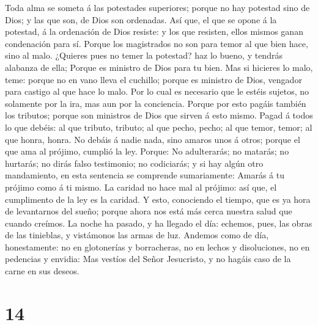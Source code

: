  Toda alma se someta á las potestades superiores; porque
no hay potestad sino de Dios; y las que son, de Dios son ordenadas.
 Así que, el que se opone á la potestad, á la ordenación
de Dios resiste: y los que resisten, ellos mismos ganan condenación para
sí.  Porque los magistrados no son para temor al que bien
hace, sino al malo. ¿Quieres pues no temer la potestad? haz lo bueno, y
tendrás alabanza de ella;  Porque es ministro de Dios para
tu bien. Mas si hicieres lo malo, teme: porque no en vano lleva el
cuchillo; porque es ministro de Dios, vengador para castigo al que hace
lo malo.  Por lo cual es necesario que le estéis sujetos,
no solamente por la ira, mas aun por la conciencia. 
Porque por esto pagáis también los tributos; porque son ministros de
Dios que sirven á esto mismo.  Pagad á todos lo que
debéis: al que tributo, tributo; al que pecho, pecho; al que temor,
temor; al que honra, honra.  No debáis á nadie nada, sino
amaros unos á otros; porque el que ama al prójimo, cumplió la ley.
 Porque: No adulterarás; no matarás; no hurtarás; no dirás
falso testimonio; no codiciarás; y si hay algún otro mandamiento, en
esta sentencia se comprende sumariamente: Amarás á tu prójimo como á ti
mismo.  La caridad no hace mal al prójimo: así que, el
cumplimento de la ley es la caridad.  Y esto, conociendo
el tiempo, que es ya hora de levantarnos del sueño; porque ahora nos
está más cerca nuestra salud que cuando creímos.  La
noche ha pasado, y ha llegado el día: echemos, pues, las obras de las
tinieblas, y vistámonos las armas de luz.  Andemos como
de día, honestamente: no en glotonerías y borracheras, no en lechos y
disoluciones, no en pedencias y envidia:  Mas vestíos del
Señor Jesucristo, y no hagáis caso de la carne en sus deseos.

\hypertarget{section-13}{%
\section{14}\label{section-13}}

